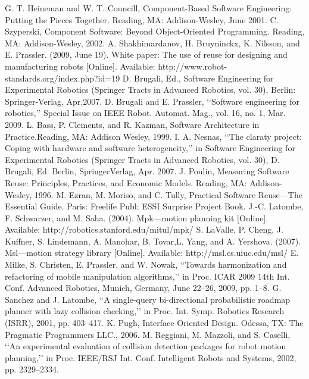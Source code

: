 \documentclass[letterpaper, 10 pt, conference]{ieeeconf}
\begin{document}
\begin{thebibliography}{}

 G. T. Heineman and W. T. Councill, Component-Based Software Engineering: Putting the Pieces Together. Reading, MA: Addison-Wesley, June
2001.
 C. Szyperski, Component Software: Beyond Object-Oriented Programming. Reading, MA: Addison-Wesley, 2002.
 A. Shakhimardanov, H. Bruyninckx, K. Nilsson, and E. Prassler. (2009, June 19). White paper: The use of reuse for designing and manufacturing robots [Online]. Available: http://www.robot-standards.org/index.php?id=19
 D. Brugali, Ed., Software Engineering for Experimental Robotics (Springer Tracts in Advanced Robotics, vol. 30), Berlin: Springer-Verlag, Apr.2007.
  D. Brugali and E. Prassler, ‘‘Software engineering for robotics,’’ Special Issue on IEEE Robot. Automat. Mag., vol. 16, no. 1, Mar. 2009.
 L. Bass, P. Clements, and R. Kazman, Software Architecture in Practice.Reading, MA: Addison Wesley, 1999.
 I. A. Nesnas, ‘‘The claraty project: Coping with hardware and software heterogeneity,’’ in Software Engineering for Experimental Robotics (Springer Tracts in Advanced Robotics, vol. 30), D. Brugali, Ed. Berlin, SpringerVerlag, Apr. 2007.
 J. Poulin, Measuring Software Reuse: Principles, Practices, and Economic Models. Reading, MA: Addison-Wesley, 1996.
 M. Ezran, M. Moriso, and C. Tully, Practical Software Reuse—The Essential Guide. Paris: Freelife Publ: ESSI Surprise Project Book.
  J.-C. Latombe, F. Schwarzer, and M. Saha. (2004). Mpk—motion planning kit [Online]. Available: http://robotics.stanford.edu/mitul/mpk/
  S. LaValle, P. Cheng, J. Kuffner, S. Lindemann, A. Manohar, B. Tovar,L. Yang, and A. Yershova. (2007). Msl—motion strategy library [Online]. Available: http://msl.cs.uiuc.edu/msl/
  E. Milke, S. Christen, E. Prassler, and W. Nowak, ‘‘Towards harmonization and refactoring of mobile manipulation algorithms,’’ in Proc. ICAR 2009 14th Int. Conf. Advanced Robotics, Munich, Germany, June 22–26, 2009, pp. 1–8.
 G. Sanchez and J. Latombe, ‘‘A single-query bi-directional probabilistic roadmap planner with lazy collision checking,’’ in Proc. Int. Symp. Robotics Research (ISRR), 2001, pp. 403–417.
 K. Pugh, Interface Oriented Design. Odessa, TX: The Pragmatic Programmers LLC., 2006.
  M. Reggiani, M. Mazzoli, and S. Caselli, ‘‘An experimental evaluation of collision detection packages for robot motion planning,’’ in Proc. IEEE/RSJ Int. Conf. Intelligent Robots and Systems, 2002, pp. 2329–2334.

\end{thebibliography}
\end{document}

